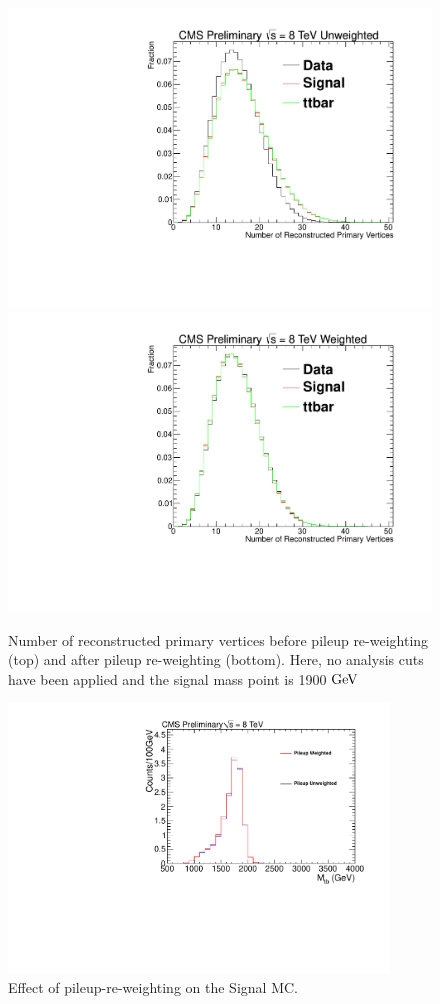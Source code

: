 \begin{figure}
\begin{center}
\includegraphics[width=0.7\linewidth]{AN-13-004/figs/npvuw.pdf}\\
\includegraphics[width=0.7\linewidth]{AN-13-004/figs/npvw.pdf}
\end{center}
\caption{Number of reconstructed primary vertices before pileup re-weighting (top) and after pileup re-weighting (bottom).  Here, no analysis cuts have been applied and the signal mass point is 1900$~\mathrm{GeV}$}
\label{figs:npvweight}
\end{figure}

\begin{figure}[htcb]
\centering
\includegraphics[width=0.9\textwidth]{AN-13-004/figs/Signal_M1900_PileupComp.pdf}
\caption{Effect of pileup-re-weighting on the Signal MC.}
\label{figs:pileup3}
\end{figure}

